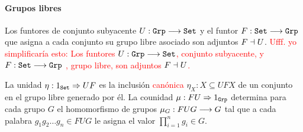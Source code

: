 \paragraph{Grupos libres}
Los funtores de conjunto subyacente $U : \texttt{Grp}\longrightarrow \texttt{Set}$ y el funtor
$F : \texttt{Set}\longrightarrow \texttt{Grp}$ que asigna a cada conjunto su grupo libre asociado
son adjuntos $F \dashv U$. \textcolor{red}{Ufff. yo simplificaría esto: Los funtores $U : \texttt{Grp}\longrightarrow \texttt{Set}$, conjunto subyacente, y $F : \texttt{Set}\longrightarrow \texttt{Grp}$ , grupo libre, son adjuntos  $F \dashv U$.}

La unidad $\eta : 1_{\texttt{Set}}\Rightarrow UF$ es la inclusión \textcolor{red}{canónica}
$\eta_X : X \subseteq UFX$ de un conjunto en el
grupo libre generado por él. La counidad
$\mu : FU\Rightarrow 1_{\texttt{Grp}}$ determina para cada grupo $G$
el homomorfismo de grupos $\mu_G : FUG\longrightarrow G$
tal que a cada palabra
$g_1g_2\ldots g_n \in FUG$ le asigna el valor $\prod_{i=1}^n g_i \in G$.
